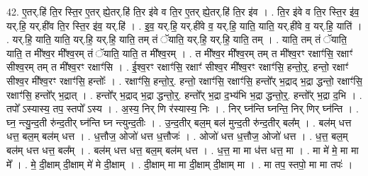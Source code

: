 \documentclass[17pt]{extarticle}
\begin{document}
42. ए॒तर्.हि॑ ति॒र स्ति॒र ए॒तर् ह्ये॒तर्.हि॑ ति॒र इ॑वे व ति॒र ए॒तर् ह्ये॒तर्.हि॑ ति॒र इ॑व । . ति॒र इ॑वे व ति॒र स्ति॒र इ॑व॒ यर्.हि॒ यर्.ही॑व ति॒र स्ति॒र इ॑व॒ यर्.हि॑ । . इ॒व॒ यर्.हि॒ यर्.ही॑वे व॒ यर्.हि॒ याति॒ याति॒ यर्.ही॑वे व॒ यर्.हि॒ याति॑ । . यर्.हि॒ याति॒ याति॒ यर्.हि॒ यर्.हि॒ याति॒ तम् तं ॅयाति॒ यर्.हि॒ यर्.हि॒ याति॒ तम् । . याति॒ तम् तं ॅयाति॒ याति॒ त मी᳚श्व॒र मी᳚श्व॒रम् तं ॅयाति॒ याति॒ त मी᳚श्व॒रम् । . त मी᳚श्व॒र मी᳚श्व॒रम् तम् त मी᳚श्व॒रꣳ रक्षाꣳ॑सि॒ रक्षाꣳ॑ सीश्व॒रम् तम् त मी᳚श्व॒रꣳ रक्षाꣳ॑सि । . ई॒श्व॒रꣳ रक्षाꣳ॑सि॒ रक्षाꣳ॑ सीश्व॒र मी᳚श्व॒रꣳ रक्षाꣳ॑सि॒ हन्तो॒र्॒. हन्तो॒ रक्षाꣳ॑ सीश्व॒र मी᳚श्व॒रꣳ रक्षाꣳ॑सि॒ हन्तोः᳚ । . रक्षाꣳ॑सि॒ हन्तो॒र्॒. हन्तो॒ रक्षाꣳ॑सि॒ रक्षाꣳ॑सि॒ हन्तो᳚र् भ॒द्राद् भ॒द्रा द्धन्तो॒ रक्षाꣳ॑सि॒ रक्षाꣳ॑सि॒ हन्तो᳚र् भ॒द्रात् । . हन्तो᳚र् भ॒द्राद् भ॒द्रा द्धन्तो॒र्॒. हन्तो᳚र् भ॒द्रा द॒भ्य॑भि भ॒द्रा द्धन्तो॒र्॒. हन्तो᳚र् भ॒द्रा द॒भि । . तपो᳚ ऽस्यास्य॒ तप॒ स्तपो᳚ ऽस्य । . अ॒स्य॒ निर् णि र॑स्यास्य॒ निः । . निर् घ्न॑न्ति घ्नन्ति॒ निर् णिर् घ्न॑न्ति । . घ्न॒ न्त्यु॒न्द॒ती रु॑न्द॒तीर् घ्न॑न्ति घ्न न्त्युन्द॒तीः । . उ॒न्द॒तीर् बल॒म् बल॑ मुन्द॒ती रु॑न्द॒तीर् बल᳚म् । . बल॑म् धत्त धत्त॒ बल॒म् बल॑म् धत्त । . ध॒त्तौज॒ ओजो॑ धत्त ध॒त्तौजः॑ । . ओजो॑ धत्त ध॒त्तौज॒ ओजो॑ धत्त । . ध॒त्त॒ बल॒म् बल॑म् धत्त धत्त॒ बल᳚म् । . बल॑म् धत्त धत्त॒ बल॒म् बल॑म् धत्त । . ध॒त्त॒ मा मा ध॑त्त धत्त॒ मा । . मा मे॑ मे॒ मा मा मे᳚ । . मे॒ दी॒क्षाम् दी॒क्षाम् मे॑ मे दी॒क्षाम् । . दी॒क्षाम् मा मा दी॒क्षाम् दी॒क्षाम् मा । . मा तप॒ स्तपो॒ मा मा तपः॑ । \newline
\end{document}
